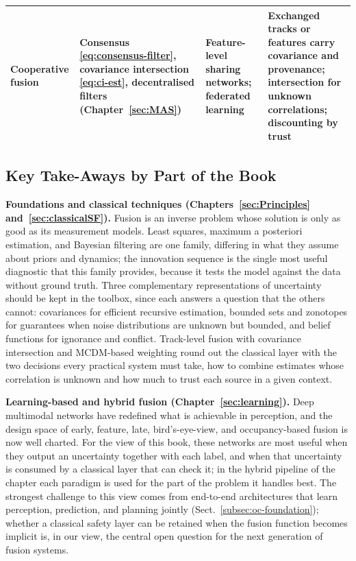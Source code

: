 \begin{table}[!t]
\begin{tabular}{>{\raggedright\arraybackslash}p{} >{\raggedright\arraybackslash}p{} >{\raggedright\arraybackslash}p{} >{\raggedright\arraybackslash}p{}}
Cooperative fusion & Consensus \eqref{eq:consensus-filter}, covariance intersection \eqref{eq:ci-est}, decentralised filters (Chapter~\ref{sec:MAS}) & Feature-level sharing networks; federated learning & Exchanged tracks or features carry covariance and provenance; intersection for unknown correlations; discounting by trust \\
\bottomrule
\end{tabular}
\end{table}

\subsection*{Key Take-Aways by Part of the Book}

\textbf{Foundations and classical techniques (Chapters~\ref{sec:Principles} and~\ref{sec:classicalSF}).} Fusion is an inverse problem whose solution is only as good as its measurement models. Least squares, maximum a posteriori estimation, and Bayesian filtering are one family, differing in what they assume about priors and dynamics; the innovation sequence is the single most useful diagnostic that this family provides, because it tests the model against the data without ground truth. Three complementary representations of uncertainty should be kept in the toolbox, since each answers a question that the others cannot: covariances for efficient recursive estimation, bounded sets and zonotopes for guarantees when noise distributions are unknown but bounded, and belief functions for ignorance and conflict. Track-level fusion with covariance intersection and MCDM-based weighting round out the classical layer with the two decisions every practical system must take, how to combine estimates whose correlation is unknown and how much to trust each source in a given context.

\textbf{Learning-based and hybrid fusion (Chapter~\ref{sec:learning}).} Deep multimodal networks have redefined what is achievable in perception, and the design space of early, feature, late, bird's-eye-view, and occupancy-based fusion is now well charted. For the view of this book, these networks are most useful when they output an uncertainty together with each label, and when that uncertainty is consumed by a classical layer that can check it; in the hybrid pipeline of the chapter each paradigm is used for the part of the problem it handles best. The strongest challenge to this view comes from end-to-end architectures that learn perception, prediction, and planning jointly (Sect.~\ref{subsec:oc-foundation}); whether a classical safety layer can be retained when the fusion function becomes implicit is, in our view, the central open question for the next generation of fusion systems.

